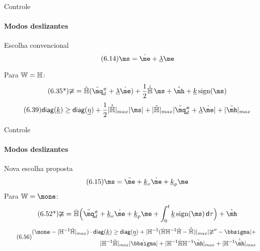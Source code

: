 \documentclass[25pt,landscape]{beamer}
\begin{document}
\begin{frame}{Controle}
    \framesubtitle{Modos deslizantes}
    \begin{block}{Escolha convencional}
    	\begin{equation} \tag{6.14} 
			\ms = \dot{\me} + \underline{\lambda} \me
		\end{equation}

		Para $\mathbb{W} = \mathbb{H}$:
		\begin{equation} \tag{6.35*}
			\mup = \hat{\mH}(\ddot{\mq}\ssh_d + \underline{\lambda} \dot{\me}) + \frac{1}{2}\dot{\hat{\mH}} \, \ms + \hat{\mh} + \underline{k} \sign(\ms)
		\end{equation}
		\begin{equation} \label{eq:DesigualdadeK2_a2} \tag{6.39}
			\diag(\underline{k})  \geq \diag(\underline{\eta}) + \frac{1}{2}|\dot{\tilde{\mH}}|_{max} |\ms| + |\tilde{\mH}|_{max} |\ddot{\mq}\ssh_d + \underline{\lambda} \dot{\me}| + |\tilde{\mh}|_{max}
		\end{equation}
    \end{block}
\end{frame}

\begin{frame}{Controle}
    \framesubtitle{Modos deslizantes}
    \begin{block}{Nova escolha proposta}
    	\begin{equation} \tag{6.15} 
			\ms = \ddot{\me} + \underline{k}_v \dot{\me} + \underline{k}_p \me
		\end{equation} 
		Para $\mW = \mone$:
		\begin{equation} \tag{6.52*}
			\mup = \hat{\mH} \Big(\ddot{\mq}\ssh_d + \underline{k}_v \dot{\me} + \underline{k}_p \me + \int_{0}^t \underline{k} \sign(\ms) \, \dd \tau \Big) + \hat{\mh}
		\end{equation}
		\begin{equation} \label{eq:DesigualdadeK2_b1} \tag{6.56}
		\begin{split}
			(\mone - | \mH^\msI \tilde{\mH}|_{max} ) \cdot \diag(\underline{k})  \geq \diag(\underline{\eta}) + |\mH^\msI ( \dot{\mH} \mH^\msI \tilde{\mH} -\dot{\tilde{\mH}}) |_{max} | \mup'' -\msigma|  + \\ |\mH^\msI \tilde{\mH}|_{max}| \dot{\msigma}| + |\mH^\msI \dot{\mH} \mH^\msI  \tilde{\mh}|_{max}+ |\mH^\msI \dot{\tilde{\mh}}|_{max}
		\end{split}
		\end{equation}
    \end{block}
\end{frame}
\end{document}
